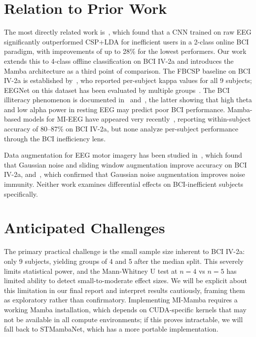 \documentclass{article}
\begin{document}
\section{Relation to Prior Work}

The most directly related work is~\cite{nakanishi2022classification}, which found that a CNN trained on raw EEG significantly outperformed CSP+LDA for inefficient users in a 2-class online BCI paradigm, with improvements of up to 28\% for the lowest performers. Our work extends this to 4-class offline classification on BCI IV-2a and introduces the Mamba architecture as a third point of comparison. The FBCSP baseline on BCI IV-2a is established by~\cite{ang2012filter}, who reported per-subject kappa values for all 9 subjects; EEGNet on this dataset has been evaluated by multiple groups~\cite{lawhern2018eegnet, altaheri2023atcnet}. The BCI illiteracy phenomenon is documented in~\cite{blankertz2009bci} and~\cite{ahn2013theta}, the latter showing that high theta and low alpha power in resting EEG may predict poor BCI performance. Mamba-based models for MI-EEG have appeared very recently~\cite{guo2025mimamba, yang2024stmamba}, reporting within-subject accuracy of 80--87\% on BCI IV-2a, but none analyze per-subject performance through the BCI inefficiency lens.

Data augmentation for EEG motor imagery has been studied in~\cite{zhao2023augmentation}, which found that Gaussian noise and sliding window augmentation improve accuracy on BCI IV-2a, and~\cite{xie2024bfatcnet}, which confirmed that Gaussian noise augmentation improves noise immunity. Neither work examines differential effects on BCI-inefficient subjects specifically.

\section{Anticipated Challenges}

The primary practical challenge is the small sample size inherent to BCI IV-2a: only 9 subjects, yielding groups of 4 and 5 after the median split. This severely limits statistical power, and the Mann-Whitney U test at $n=4$ vs $n=5$ has limited ability to detect small-to-moderate effect sizes. We will be explicit about this limitation in our final report and interpret results cautiously, framing them as exploratory rather than confirmatory. Implementing MI-Mamba requires a working Mamba installation, which depends on CUDA-specific kernels that may not be available in all compute environments; if this proves intractable, we will fall back to STMambaNet, which has a more portable implementation.
\end{document}

